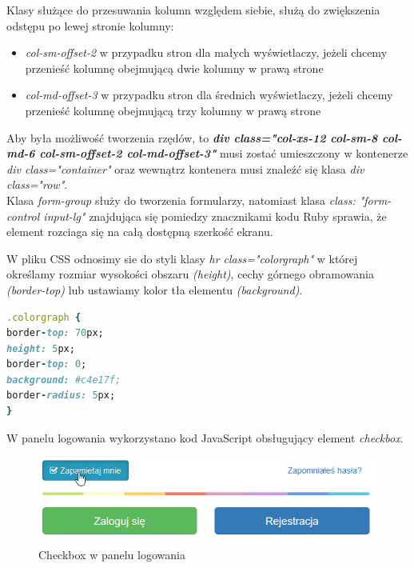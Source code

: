\documentclass[openright]{xmgr}
\begin{document}
Klasy służące do przesuwania kolumn względem siebie, służą do zwiększenia odstępu po lewej stronie kolumny:
\begin{itemize}
\item
\textit{col-sm-offset-2} w przypadku stron dla małych wyświetlaczy, jeżeli chcemy przenieść kolumnę obejmującą dwie kolumny w prawą strone
\item
\textit{col-md-offset-3} w przypadku stron dla średnich wyświetlaczy, jeżeli chcemy przenieść kolumnę obejmującą trzy kolumny w prawą strone
\end{itemize}

\indent Aby była możliwość tworzenia rzędów, to \textbf{\textit{div class="col-xs-12 col-sm-8 col-md-6 col-sm-offset-2 col-md-offset-3"}} musi zostać umieszczony w kontenerze \textit{div class="container"} oraz wewnątrz kontenera musi znaleźć się klasa \textit{div class="row"}.\\

Klasa \textit{form-group} służy do tworzenia formularzy, natomiast klasa \textit{class: "form-control input-lg"} znajdująca się pomiedzy znacznikami kodu Ruby sprawia, że element rozciaga się na całą dostępną szerkość ekranu.

W pliku CSS odnosimy sie do styli klasy  \textit{hr class="colorgraph"} w której określamy rozmiar wysokości obszaru \textit{(height)}, cechy górnego obramowania \textit{(border-top)} lub ustawiamy kolor tła elementu \textit{(background)}.
\begin{lstlisting}[language=Ruby,lineskip={-1pt},caption=Kod CSS dla panelu logowania]
.colorgraph {
border-top: 70px;
height: 5px;
border-top: 0;
background: #c4e17f;
border-radius: 5px;
}
\end{lstlisting}

W panelu logowania wykorzystano kod JavaScript obsługujący element \textit{checkbox}.\\

\begin{figure}[!tbh]
	\centering
	\includegraphics[width=\linewidth]{image/checkbox}
	\caption{Checkbox w panelu logowania}
\end{figure}	
	
\end{document}
